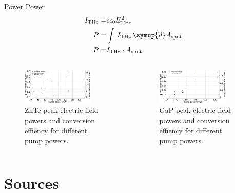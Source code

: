 \documentclass[aspectratio=1610, 9pt]{beamer}
\begin{document}
\begin{frame}{Power}
  Power \cite{griffiths}
  \begin{align}
    I_\text{THz} =& c \epsilon_0 E_\text{THz}^2 \\
    P =& \int\, I_\text{THz} \,\symup{d}A_\text{spot}\\
    P =& I_\text{THz}\cdot A_\text{spot}
\end{align}
  \begin{columns}
    \begin{column}{.5\textwidth}
  \begin{figure}
    \includegraphics[width=0.8\textwidth]{images/Powerznte.pdf}
    \caption{ZnTe peak electric field powers and conversion effiency for different pump powers.}
  \end{figure}
  \end{column}
  \begin{column}{.5\textwidth}
    \begin{figure}
      \includegraphics[width=0.8\textwidth]{images/Powergap.pdf}
      \caption{GaP peak electric field powers and conversion effiency for different pump powers.}
    \end{figure}    
  \end{column}
  \end{columns}
\end{frame}

\section{Sources}
\printbibliography
\end{document}
